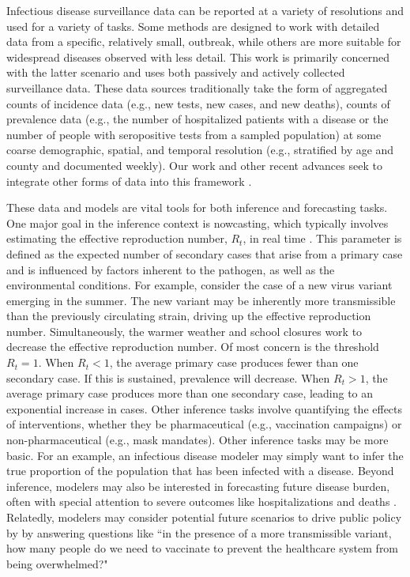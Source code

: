 Infectious disease surveillance data can be reported at a variety of resolutions and used for a variety of tasks.
Some methods are designed to work with detailed data from a specific, relatively small, outbreak, while others are more suitable for widespread diseases observed with less detail.
This work is primarily concerned with the latter scenario and uses both passively and actively collected surveillance data.
These data sources traditionally take the form of aggregated counts of incidence data (e.g., new tests, new cases, and new deaths), counts of prevalence data (e.g., the number of hospitalized patients with a disease or the number of people with seropositive tests from a sampled population) at some coarse demographic, spatial, and temporal resolution (e.g., stratified by age and county and documented weekly).
Our work and other recent advances seek to integrate other forms of data into this framework \citep{Rasmussen2011, Tang2022}.

These data and models are vital tools for both inference and forecasting tasks.
One major goal in the inference context is nowcasting, which typically involves estimating the effective reproduction number, \( R_t \), in real time \citep{10.1093/aje/kwt133}.
This parameter is defined as the expected number of secondary cases that arise from a primary case and is influenced by factors inherent to the pathogen, as well as the environmental conditions.
For example, consider the case of a new virus variant emerging in the summer.
The new variant may be inherently more transmissible than the previously circulating strain, driving up the effective reproduction number.
Simultaneously, the warmer weather and school closures work to decrease the effective reproduction number.
Of most concern is the threshold \( R_t = 1 \).
When \( R_t < 1 \), the average primary case produces fewer than one secondary case.
If this is sustained, prevalence will decrease.
When \( R_t > 1 \), the average primary case produces more than one secondary case, leading to an exponential increase in cases.
Other inference tasks involve quantifying the effects of interventions, whether they be pharmaceutical (e.g., vaccination campaigns) or non-pharmaceutical (e.g., mask mandates).
Other inference tasks may be more basic.
For an example, an infectious disease modeler may simply want to infer the true proportion of the population that has been infected with a disease.
Beyond inference, modelers may also be interested in forecasting future disease burden, often with special attention to severe outcomes like hospitalizations and deaths \citep{10.1371/journal.pmed.1003793}.
Relatedly, modelers may consider potential future scenarios to drive public policy by  by answering questions like ``in the presence of a more transmissible variant, how many people do we need to vaccinate to prevent the healthcare system from being overwhelmed?"

